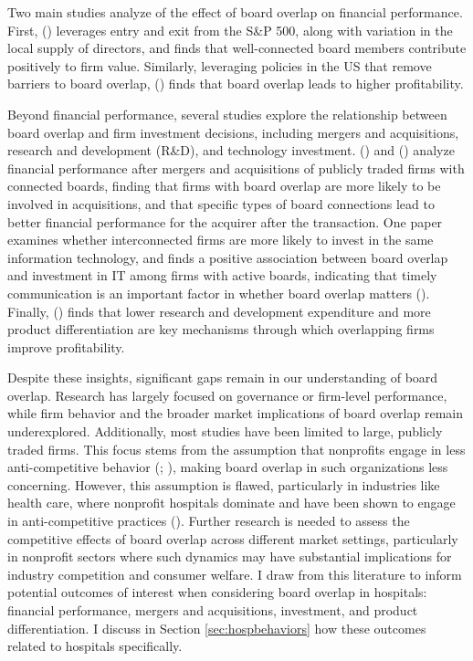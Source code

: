 \documentclass[12pt]{article}
\begin{document}
    Two main studies analyze of the effect of board overlap on financial performance. First, \citeauthor{baran2017director} (\citeyear{baran2017director}) leverages entry and exit from the S\&P 500, along with variation in the local supply of directors, and finds that well-connected board members contribute positively to firm value. Similarly, leveraging policies in the US that remove barriers to board overlap, \citeauthor{geng2021does} (\citeyear{geng2021does}) finds that board overlap leads to higher profitability. 
    
    Beyond financial performance, several studies explore the relationship between board overlap and firm investment decisions, including mergers and acquisitions, research and development (R\&D), and technology investment. \citeauthor{schonlau2009board} (\citeyear{schonlau2009board}) and \citeauthor{cai2012board} (\citeyear{cai2012board}) analyze financial performance after mergers and acquisitions of publicly traded firms with connected boards, finding that firms with board overlap are more likely to be involved in acquisitions, and that specific types of board connections lead to better financial performance for the acquirer after the transaction. One paper examines whether interconnected firms are more likely to invest in the same information technology, and finds a positive association between board overlap and investment in IT among firms with active boards, indicating that timely communication is an important factor in whether board overlap matters (\cite{cheng2021social}). Finally, \citeauthor{geng2021does} (\citeyear{geng2021does}) finds that lower research and development expenditure and more product differentiation are key mechanisms through which overlapping firms improve profitability. 

    Despite these insights, significant gaps remain in our understanding of board overlap. Research has largely focused on governance or firm-level performance, while firm behavior and the broader market implications of board overlap remain underexplored. Additionally, most studies have been limited to large, publicly traded firms. This focus stems from the assumption that nonprofits engage in less anti-competitive behavior (\cite{baer2014clayton}; \cite{aai2013section7}), making board overlap in such organizations less concerning. However, this assumption is flawed, particularly in industries like health care, where nonprofit hospitals dominate and have been shown to engage in anti-competitive practices (\cite{hulver2023ftc}). Further research is needed to assess the competitive effects of board overlap across different market settings, particularly in nonprofit sectors where such dynamics may have substantial implications for industry competition and consumer welfare. I draw from this literature to inform potential outcomes of interest when considering board overlap in hospitals: financial performance, mergers and acquisitions, investment, and product differentiation. I discuss in Section \ref{sec:hospbehaviors} how these outcomes related to hospitals specifically. 
\end{document}
